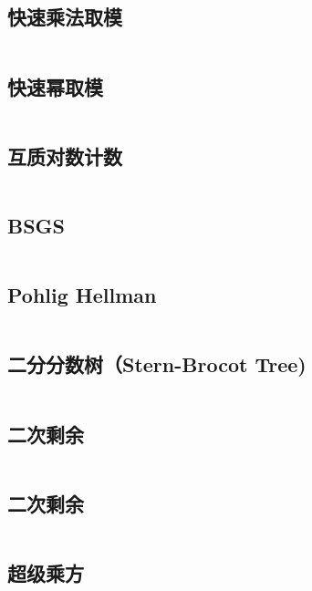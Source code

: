 \inputminted{cpp}{code/inv.cc}

\subsection{快速乘法取模} 

\inputminted{cpp}{code/mul.cc}

\subsection{快速幂取模} 

\inputminted{cpp}{code/powMod.cc}

\subsection{互质对数计数} 

\inputminted{cpp}{code/NumofCo-prime.cc}

\subsection{BSGS} 

\inputminted{cpp}{code/Bsgs.cc}

\subsection{Pohlig Hellman} 

\inputminted{cpp}{code/pohlig_hellman.cc}

\subsection{二分分数树（Stern-Brocot Tree)} 

\inputminted{cpp}{code/Stern-BrocotTree.cc}

\subsection{二次剩余} 

\inputminted{cpp}{code/QuadraticResidue.cc}

\subsection{二次剩余} 

\inputminted{cpp}{code/二次剩余.cc}

\subsection{超级乘方} 

